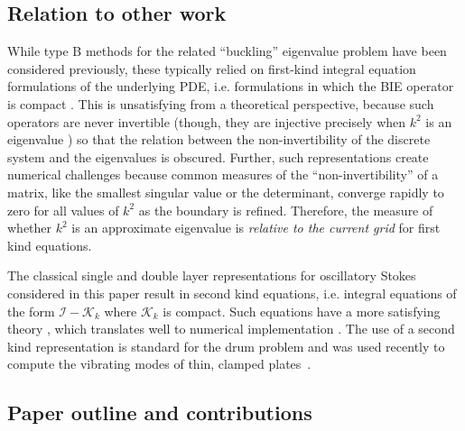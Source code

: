\subsection{Relation to other work}

While type B methods for the
related ``buckling'' eigenvalue problem
have been considered previously,
these typically relied on first-kind integral
equation formulations of the underlying PDE,
i.e. formulations in which the BIE operator is
compact \cite{kitahara2014boundary,antunes2011buckling}.
%
This is unsatisfying from a theoretical
perspective, because such operators are never invertible
(though, they are injective precisely when $k^2$ is an
eigenvalue \cite{kitahara2014boundary,antunes2011buckling})
so that the relation between the non-invertibility of the
discrete system and the eigenvalues is obscured.
%
Further,
such representations create numerical challenges because
common measures of the ``non-invertibility'' of a matrix,
like the smallest singular value or the determinant, converge
rapidly to zero for all values of $k^2$ as the boundary is
refined. Therefore, the measure of whether $k^2$ is an
approximate eigenvalue is {\em relative to the current grid}
for first kind equations.

The classical single and double layer representations
for oscillatory Stokes considered in this paper
result in second kind equations, i.e. integral equations
of the form $\mathcal{I} - \mathcal{K}_k$ where
$\mathcal{K}_k$ is compact.
%
Such equations have a more satisfying theory
\cite{reed1972methods,colton1983integral,kress1989linear},
which translates well to numerical implementation
\cite{atkinson2009numerical,bornemann2010numerical,
  hackbusch2012integral,zhao2015robust}.
%
The use of a second kind representation is standard
for the drum problem \cite{backer2003numerical,zhao2015robust}
and was used recently to compute the vibrating
modes of thin, clamped plates~\cite{lindsay2018boundary}.

\subsection{Paper outline and contributions}

